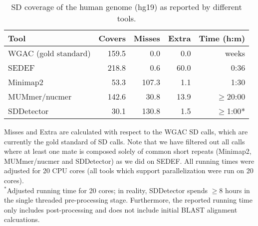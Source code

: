 \documentclass{article}
\begin{document}
\begin{table}[htb!]
\centering
\caption{SD coverage of the human genome (hg19) as reported by different tools. }
\begin{tabular}{lrrrr}
\textbf{Tool} & \textbf{Covers} & \textbf{Misses} & \textbf{Extra} & \textbf{Time (h:m)} \\
\hline
WGAC (gold standard) & 159.5 & 0.0 & 0.0 & weeks \\
SEDEF         & 218.8 &   0.6 & 60.0 & 0:36 \\
Minimap2      &  53.3 & 107.3 &  1.1 & 1:30 \\
MUMmer/nucmer & 142.6 &  30.8 & 13.9 & $\geq$20:00 \\
SDDetector    &  30.1 & 130.8 &  1.5 & $\geq$1:00* \\
\hline
\end{tabular}
\begin{minipage}{\textwidth}
\footnotesize
Misses and Extra are calculated with respect to the WGAC SD calls, which are currently the gold standard of SD calls. Note that we  have filtered out all calls where at least one mate is composed solely of common short repeats (Minimap2, MUMmer/nucmer and SDDetector) as we did on SEDEF. All running times were adjusted for 20 CPU cores (all tools which support parallelization were run on 20 cores). \\
$^*$Adjusted running time for 20 cores; in reality, SDDetector spends
$\geq 8$ hours in the single threaded pre-processing stage. Furthermore,
the reported running time only includes post-processing and does
not include initial BLAST alignment calcuations.
\end{minipage}
\label{tab:compare}
\end{table}

\end{document}
